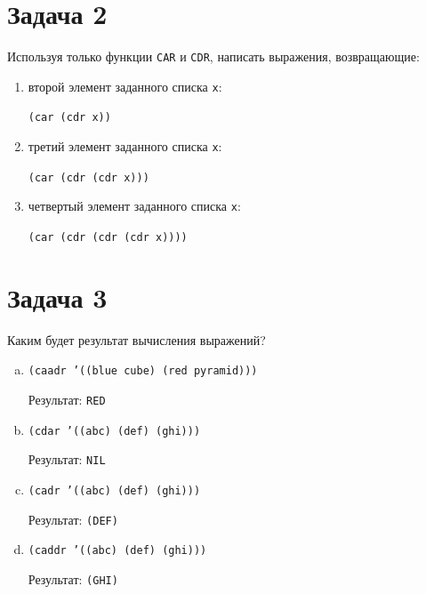 \clearpage

\section{Задача 2}

Используя только функции \texttt{CAR} и \texttt{CDR}, написать выражения, возвращающие:

\begin{enumerate}
	\item второй элемент заданного списка \texttt{x}:
	
	\hspace{2cm} \texttt{(car (cdr x))}
	
	\item третий элемент заданного списка \texttt{x}:

	\hspace{2cm} \texttt{(car (cdr (cdr x)))}
	
	\item четвертый элемент заданного списка \texttt{x}:

	\hspace{2cm} \texttt{(car (cdr (cdr (cdr x))))}
\end{enumerate}

\section{Задача 3}

Каким будет результат вычисления выражений?

\begin{enumerate}[a)]
	\item \texttt{(caadr '((blue cube) (red pyramid)))}
	
	\hspace{2cm} Результат: \texttt{RED}
	
	\item \texttt{(cdar '((abc) (def) (ghi)))}
	
	\hspace{2cm} Результат: \texttt{NIL}
	
	\item \texttt{(cadr '((abc) (def) (ghi)))}
	
	\hspace{2cm} Результат: \texttt{(DEF)}
	
	\item \texttt{(caddr '((abc) (def) (ghi)))}
	
	\hspace{2cm} Результат: \texttt{(GHI)}
\end{enumerate}

